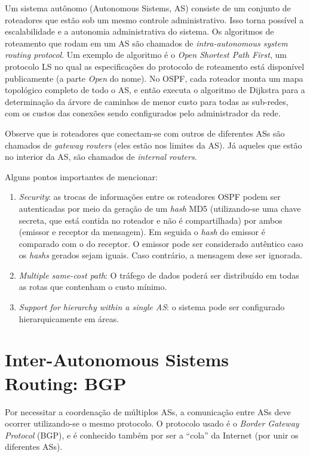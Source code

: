 Um sistema autônomo (Autonomous Sistems, AS) consiste de um conjunto de
roteadores que estão sob um mesmo controle administrativo. Isso torna
possível a escalabilidade e a autonomia administrativa do sistema. Os
algoritmos de roteamento que rodam em um AS são chamados de
\emph{intra-autonomous system routing protocol}. Um exemplo de algoritmo
é o \emph{Open Shortest Path First}, um protocolo LS no qual as
especificações do protocolo de roteamento está disponível publicamente
(a parte \emph{Open} do nome). No OSPF, cada roteador monta um mapa
topológico completo de todo o AS, e então executa o algoritmo de
Dijkstra para a determinação da árvore de caminhos de menor custo para
todas as sub-redes, com os custos das conexões sendo configurados pelo
administrador da rede.

Observe que is roteadores que conectam-se com outros de diferentes ASs
são chamados de \emph{gateway routers} (eles estão nos limites da AS).
Já aqueles que estão no interior da AS, são chamados de \emph{internal
routers}.

Alguns pontos importantes de mencionar:

\begin{enumerate}
\def\labelenumi{\arabic{enumi}.}
\item
  \emph{Security}: as trocas de informações entre os roteadores OSPF
  podem ser autenticadas por meio da geração de um \emph{hash} MD5
  (utilizando-se uma chave secreta, que está contida no roteador e não é
  compartilhada) por ambos (emissor e receptor da mensagem). Em seguida
  o \emph{hash} do emissor é comparado com o do receptor. O emissor pode
  ser considerado autêntico caso os \emph{hashs} gerados sejam iguais.
  Caso contrário, a mensagem dese ser ignorada.
\item
  \emph{Multiple same-cost path}: O tráfego de dados poderá ser
  distribuído em todas as rotas que contenham o custo mínimo.
\item
  \emph{Support for hierarchy within a single AS}: o sistema pode ser
  configurado hierarquicamente em áreas.
\end{enumerate}

\hypertarget{inter-autonomous-sistems-routing-bgp}{%
\section{Inter-Autonomous Sistems Routing: BGP}\label{inter-autonomous-sistems-routing-bgp}}

Por necessitar a coordenação de múltiplos ASs, a comunicação entre ASs
deve ocorrer utilizando-se o mesmo protocolo. O protocolo usado é o
\emph{Border Gateway Protocol} (BGP), e é conhecido também por ser a
``cola'' da Internet (por unir os diferentes ASs).

